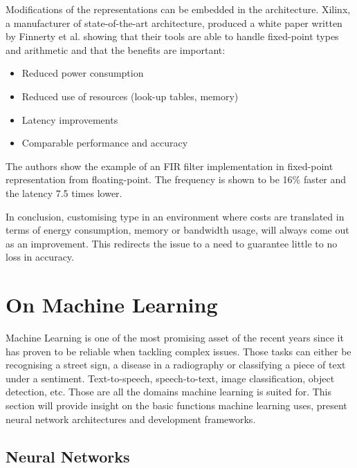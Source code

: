 Modifications of the representations can be embedded in the architecture. Xilinx, a manufacturer of state-of-the-art architecture, produced a white paper written by Finnerty et al. \cite{Xilinx2017} showing that their tools are able to handle fixed-point types and arithmetic and that the benefits are important:
\begin{itemize}
  \item Reduced power consumption
  \item Reduced use of resources (look-up tables, memory)
  \item Latency improvements
  \item Comparable performance and accuracy
\end{itemize}
The authors show the example of an FIR filter implementation in fixed-point representation from floating-point. The frequency is shown to be 16\% faster and the latency 7.5 times lower.

In conclusion, customising type in an environment where costs are translated in terms of energy consumption, memory or bandwidth usage, will always come out as an improvement. This redirects the issue to a need to guarantee little to no loss in accuracy.


\section{On Machine Learning}

Machine Learning is one of the most promising asset of the recent years since it has proven to be reliable when tackling complex issues. Those tasks can either be recognising a street sign, a disease in a radiography or classifying a piece of text under a sentiment. Text-to-speech, speech-to-text, image classification, object detection, etc. Those are all the domains machine learning is suited for. This section will provide insight on the basic functions machine learning uses, present neural network architectures and development frameworks.


\subsection{Neural Networks}

